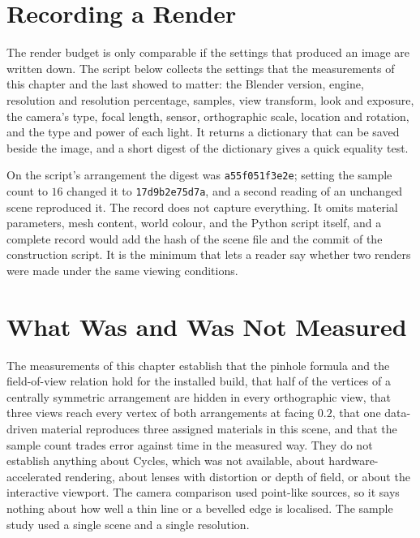 \section{Recording a Render}

The render budget is only comparable if the settings that produced an image are written down. The script below collects the settings that the measurements of this chapter and the last showed to matter: the Blender version, engine, resolution and resolution percentage, samples, view transform, look and exposure, the camera's type, focal length, sensor, orthographic scale, location and rotation, and the type and power of each light. It returns a dictionary that can be saved beside the image, and a short digest of the dictionary gives a quick equality test.



On the script's arrangement the digest was \texttt{a55f051f3e2e}; setting the sample count to $16$ changed it to \texttt{17d9b2e75d7a}, and a second reading of an unchanged scene reproduced it. The record does not capture everything. It omits material parameters, mesh content, world colour, and the Python script itself, and a complete record would add the hash of the scene file and the commit of the construction script. It is the minimum that lets a reader say whether two renders were made under the same viewing conditions.

\section{What Was and Was Not Measured}

The measurements of this chapter establish that the pinhole formula and the field-of-view relation hold for the installed build, that half of the vertices of a centrally symmetric arrangement are hidden in every orthographic view, that three views reach every vertex of both arrangements at facing $0.2$, that one data-driven material reproduces three assigned materials in this scene, and that the sample count trades error against time in the measured way. They do not establish anything about Cycles, which was not available, about hardware-accelerated rendering, about lenses with distortion or depth of field, or about the interactive viewport. The camera comparison used point-like sources, so it says nothing about how well a thin line or a bevelled edge is localised. The sample study used a single scene and a single resolution.

